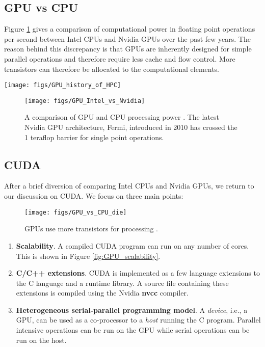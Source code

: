 \documentclass{article}
\begin{document}
\subsection{GPU vs CPU}
Figure \ref{fig:GPU_Intel_vs_Nvidia} gives a comparison of computational power in floating point operations per second between Intel CPUs and Nvidia GPUs over the past few years.  The reason behind this discrepancy is that GPUs are inherently designed for simple parallel operations and therefore require less cache and flow control.  More transistors can therefore be allocated to the computational elements.


	\begin{figure*}
		\texttt{[image: figs/GPU\_history\_of\_HPC]}
		\caption{History of high performance computing}
		\label{fig:HPC}
	\end{figure*}	

		\begin{figure}
			\texttt{[image: figs/GPU\_Intel\_vs\_Nvidia]}
			\caption{A comparison of GPU and CPU processing power  \cite{2010_MAN_CUDA_Nvidia}.  The latest Nvidia GPU architecture, Fermi, introduced in 2010 has crossed the 1 teraflop barrier for single point operations.}
			\label{fig:GPU_Intel_vs_Nvidia}
		\end{figure}

\subsection{CUDA}
After a brief diversion of comparing Intel CPUs and Nvidia GPUs, we return to our discussion on CUDA.  We focus on three main points:

\begin{figure}
	\texttt{[image: figs/GPU\_vs\_CPU\_die]}
	\caption{GPUs use more transistors for processing \cite{2010_MAN_CUDA_Nvidia}.}
	\label{fig:GPU_vs_CPU_die}
\end{figure}

 \begin{enumerate}
	\item \textbf{Scalability}.  A compiled CUDA program can run on any number of cores.  This is shown in Figure \ref{fig:GPU_scalability}.
	\item \textbf{C/C++ extensions}.  CUDA is implemented as a few language extensions to the C language and a runtime library.  A source file containing these extensions is compiled using the Nvidia \textbf{nvcc} compiler.
	\item \textbf{Heterogeneous serial-parallel programming model}.  A \emph{device}, i.e., a GPU, can be used as a co-processor to a \emph{host} running the C program.  Parallel intensive operations can be run on the GPU while serial operations can be run on the host.
\end{enumerate}
\end{document}
